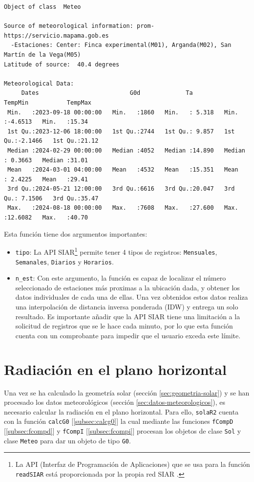 \begin{verbatim}
Object of class  Meteo 

Source of meteorological information: prom-https://servicio.mapama.gob.es 
  -Estaciones: Center: Finca experimental(M01), Arganda(M02), San Martín de la Vega(M05) 
Latitude of source:  40.4 degrees

Meteorological Data:
     Dates                          G0d             Ta            TempMin           TempMax     
 Min.   :2023-09-18 00:00:00   Min.   :1860   Min.   : 5.318   Min.   :-4.6513   Min.   :15.34  
 1st Qu.:2023-12-06 18:00:00   1st Qu.:2744   1st Qu.: 9.857   1st Qu.:-2.1466   1st Qu.:21.12  
 Median :2024-02-29 00:00:00   Median :4052   Median :14.890   Median : 0.3663   Median :31.01  
 Mean   :2024-03-01 04:00:00   Mean   :4532   Mean   :15.351   Mean   : 2.4225   Mean   :29.41  
 3rd Qu.:2024-05-21 12:00:00   3rd Qu.:6616   3rd Qu.:20.047   3rd Qu.: 7.1506   3rd Qu.:35.47  
 Max.   :2024-08-18 00:00:00   Max.   :7608   Max.   :27.600   Max.   :12.6082   Max.   :40.70
\end{verbatim}

Esta función tiene dos argumentos importantes:
\begin{itemize}
\item \texttt{tipo}: La API SIAR\footnote{La API (Interfaz de Programación de Aplicaciones) que se usa para la función \texttt{readSIAR} está proporcionada por la propia red SIAR \cite{siar23}.} permite tener 4 tipos de registros: \texttt{Mensuales}, \texttt{Semanales}, \texttt{Diarios} y \texttt{Horarios}.
\item \texttt{n\_est}: Con este argumento, la función es capaz de localizar el número seleccionado de estaciones más proximas a la ubicación dada, y obtener los datos individuales de cada una de ellas. Una vez obtenidos estos datos realiza una interpolación de distancia inversa ponderada (IDW) y entrega un solo resultado. Es importante añadir que la API SIAR tiene una limitación a la solicitud de registros que se le hace cada minuto, por lo que esta función cuenta con un comprobante para impedir que el usuario exceda este límite.
\end{itemize}

\section{Radiación en el plano horizontal}
\label{sec:orgb6c82a6}
\label{sec:radiacion-plano-horizontal}
Una vez se ha calculado la geometría solar (sección \ref{sec:geometria-solar}) y se han procesado los datos meteorológicos (sección \ref{sec:datos-meteorologicos}), es necesario calcular la radiación en el plano horizontal. Para ello, \texttt{solaR2} cuenta con la función \texttt{calcG0} [\ref{subsec:calcg0}] la cual mediante las funciones \texttt{fCompD} [\ref{subsec:fcompd}] y \texttt{fCompI} [\ref{subsec:fcompi}] procesan los objetos de clase \texttt{Sol} y clase \texttt{Meteo} para dar un objeto de tipo \texttt{G0}.

